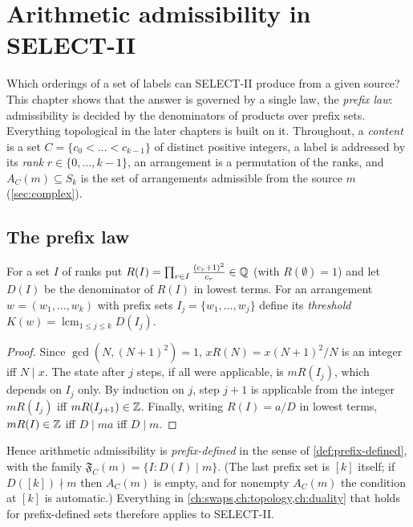 \chapter{Arithmetic admissibility in SELECT-II}\label{ch:arith}

Which orderings of a set of labels can SELECT-II produce from a given source? This chapter shows that the answer is governed by a single law, the \emph{prefix law}: admissibility is decided by the denominators of products over prefix sets. Everything topological in the later chapters is built on it. Throughout, a \emph{content} is a set $C=\{c_0<\dots<c_{k-1}\}$ of distinct positive integers, a label is addressed by its \emph{rank} $r\in\{0,\dots,k-1\}$, an arrangement is a permutation of the ranks, and $A_C(m)\subseteq S_k$ is the set of arrangements admissible from the source $m$ (\cref{sec:complex}).

\section{The prefix law}
For a set $I$ of ranks put $R(I)=\prod_{r\in I}\frac{(c_r+1)^2}{c_r}\in\mathbb{Q}$ (with $R(\emptyset)=1$) and let $D(I)$ be the denominator of $R(I)$ in lowest terms. For an arrangement $w=(w_1,\dots,w_k)$ with prefix sets $I_j=\{w_1,\dots,w_j\}$ define its \emph{threshold} $K(w)=\operatorname{lcm}_{1\le j\le k}D(I_j)$.

\begin{proof}
Since $\gcd(N,(N{+}1)^2)=1$, $xR(N)=x(N{+}1)^2/N$ is an integer iff $N\mid x$. The state after $j$ steps, if all were applicable, is $mR(I_j)$, which depends on $I_j$ only. By induction on $j$, step $j{+}1$ is applicable from the integer $mR(I_j)$ iff $mR(I_{j+1})\in\mathbb{Z}$. Finally, writing $R(I)=a/D$ in lowest terms, $mR(I)\in\mathbb{Z}$ iff $D\mid ma$ iff $D\mid m$.
\end{proof}

Hence arithmetic admissibility is \emph{prefix-defined} in the sense of \cref{def:prefix-defined}, with the family $\mathfrak F_C(m)=\{I: D(I)\mid m\}$. (The last prefix set is $[k]$ itself; if $D([k])\nmid m$ then $A_C(m)$ is empty, and for nonempty $A_C(m)$ the condition at $[k]$ is automatic.) Everything in \cref{ch:swaps,ch:topology,ch:duality} that holds for prefix-defined sets therefore applies to SELECT-II.

